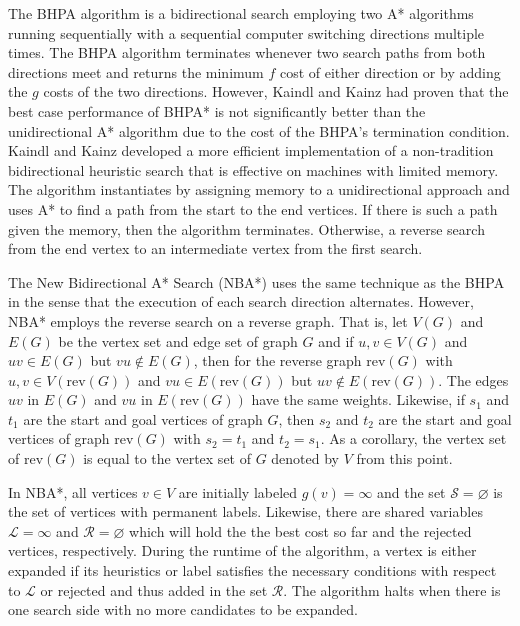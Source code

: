 The BHPA algorithm is a bidirectional search employing two A* algorithms running sequentially with a sequential 
computer switching directions multiple times. The BHPA algorithm terminates whenever two search paths from both directions 
meet and returns the minimum $f$ cost of either direction or by adding the $g$ costs of the two directions.
However, Kaindl and Kainz had proven that the best case performance of BHPA* is not significantly better than 
the unidirectional A* algorithm due to the cost of the BHPA's termination condition.\cite{KainlKainz1997}
Kaindl and Kainz developed a more efficient implementation of a non-tradition bidirectional heuristic search that is effective 
on machines with limited memory. The algorithm instantiates by assigning memory to a unidirectional approach and uses A* to find 
a path from the start to the end vertices. If there is such a path given the memory, then the algorithm terminates. Otherwise, 
a reverse search from the end vertex to an intermediate vertex from the first search.

The New Bidirectional A* Search (NBA*) uses the same technique as the BHPA in the sense that the execution of each search direction alternates.\cite{Pijls2009}
However, NBA* employs the reverse search on a reverse graph. That is, let $V(G)$ and $E(G)$ be the vertex set and edge set of graph $G$ and if $u,v\in V(G)$ and 
$uv\in E(G)$ but $vu\notin E(G)$, then for the reverse graph $\text{rev}(G)$ with $u,v\in V(\text{rev}(G))$ and $vu\in E(\text{rev}(G))$ but $uv\notin E(\text{rev}(G))$.
The edges $uv$ in $E(G)$ and $vu$ in $E(\text{rev}(G))$ have the same weights. Likewise, if $s_1$ and $t_1$ are the start and goal vertices of 
graph $G$, then $s_2$ and $t_2$ are the start and goal vertices of graph $\text{rev}(G)$ with $s_2=t_1$ and $t_2=s_1$. As a corollary, the vertex set of $\text{rev}(G)$
is equal to the vertex set of $G$ denoted by $V$ from this point.

In NBA*, all vertices $v\in V$ are initially labeled $g(v)=\infty$ and the set $\mathcal{S}=\varnothing$ is the set of vertices with
permanent labels. Likewise, there are shared variables $\mathcal{L}=\infty$ and $\mathcal{R}=\varnothing$ which will hold the the 
best cost so far and the rejected vertices, respectively. During the runtime of the algorithm, a vertex is either expanded if its heuristics 
or label satisfies the necessary conditions with respect to $\mathcal{L}$ or rejected and thus added in the set $\mathcal{R}$.
The algorithm halts when there is one search side with no more candidates to be expanded.



